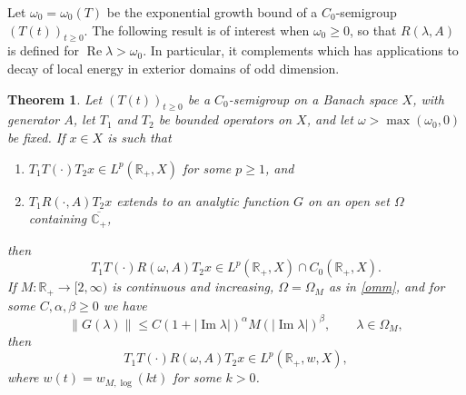 \documentclass[11pt]{amsart}
\newtheorem{theorem}{Theorem}[section]
\theoremstyle{definition}
\theoremstyle{remark}
\numberwithin{equation}{section}
\begin{document}
Let $\omega_0 = \omega_0(T)$ be the exponential growth bound of a $C_0$-semigroup $(T(t))_{t \ge 0}$.  The following result is of interest when $\omega_0\ge0$, so that $R(\lambda,A)$ is defined for ${\operatorname{Re}}\lambda>\omega_0$.  In particular, it complements \cite[Th\'eor\`eme 3]{Bu98} which has applications to decay of local energy in exterior domains of odd dimension.

\begin{theorem}\label{energydecayabs}
Let $(T(t))_{t \ge 0}$ be a $C_0$-semigroup on a Banach space $X$, with generator $A$,  let $T_1$ and $T_2$ be bounded operators on $X$, and let $\omega >\max(\omega_0,0)$ be fixed.
If $x \in X$ is such that
\begin{enumerate}[\rm(i)]
\item $T_1T(\cdot)T_2x \in L^p (\mathbb R_+, X)$ for some $p \ge 1$, and
\item $T_1R(\cdot, A)T_2x$ extends to an analytic function $G$ on an open set $\Omega$ containing $\overline{{{\mathbb C}}_+}$,
\end{enumerate}
 then
 \begin{equation}\label{cutofflp}
 T_1T(\cdot)R(\omega,A)T_2 x \in L^p (\mathbb R_+, X) \cap C_0(\mathbb R_+, X).
 \end{equation}
If $M:\mathbb R_+\to [2,\infty)$ is continuous and increasing, $\Omega = \Omega_M$ as in \eqref{omm}, and for some $C,\alpha,\beta\ge 0$ we have
\begin{equation}\label{q91}
\|G(\lambda)\| \le C(1+|{\operatorname{Im}} \lambda|)^\alpha M(|{\operatorname{Im}}\lambda|)^\beta, \qquad \lambda \in \Omega_M,
\end{equation}
then
 \begin{equation}\label{cutofflprates}
 T_1T(\cdot)R(\omega,A) T_2 x \in L^p (\mathbb R_+, w, X),
 \end{equation}
 where $w(t) ={w_{M,{\log}}}(kt)$ 
 for some $k>0$.
\end{theorem}
\end{document}
